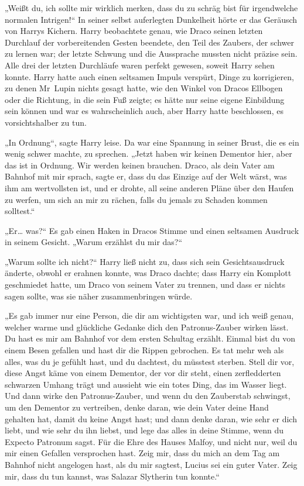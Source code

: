 {„Weißt du, ich sollte mir wirklich merken, dass du zu schräg bist für irgendwelche normalen Intrigen!“ In seiner selbst auferlegten Dunkelheit hörte er das Geräusch von Harrys Kichern. Harry beobachtete genau, wie Draco seinen letzten Durchlauf der vorbereitenden Gesten beendete, den Teil des Zaubers, der schwer zu lernen war; der letzte Schwung und die Aussprache mussten nicht präzise sein. Alle drei der letzten Durchläufe waren perfekt gewesen, soweit Harry sehen konnte. Harry hatte auch einen seltsamen Impuls verspürt, Dinge zu korrigieren, zu denen Mr~Lupin nichts gesagt hatte, wie den Winkel von Dracos Ellbogen oder die Richtung, in die sein Fuß zeigte; es hätte nur seine eigene Einbildung sein können und war es wahrscheinlich auch, aber Harry hatte beschlossen, es vorsichtshalber zu tun.

„In Ordnung“, sagte Harry leise. Da war eine Spannung in seiner Brust, die es ein wenig schwer machte, zu sprechen. „Jetzt haben wir keinen Dementor hier, aber das ist in Ordnung. Wir werden keinen brauchen. Draco, als dein Vater am Bahnhof mit mir sprach, sagte er, dass du das Einzige auf der Welt wärst, was ihm am wertvollsten ist, und er drohte, all seine anderen Pläne über den Haufen zu werfen, um sich an mir zu rächen, falls du jemals zu Schaden kommen solltest.“

„Er… was?“ Es gab einen Haken in Dracos Stimme und einen seltsamen Ausdruck in seinem Gesicht. „Warum erzählst du mir das?“

„Warum sollte ich nicht?“ Harry ließ nicht zu, dass sich sein Gesichtsausdruck änderte, obwohl er erahnen konnte, was Draco dachte; dass Harry ein Komplott geschmiedet hatte, um Draco von seinem Vater zu trennen, und dass er nichts sagen sollte, was sie näher zusammenbringen würde.

„Es gab immer nur eine Person, die dir am wichtigsten war, und ich weiß genau, welcher warme und glückliche Gedanke dich den Patronus-Zauber wirken lässt. Du hast es mir am Bahnhof vor dem ersten Schultag erzählt. Einmal bist du von einem Besen gefallen und hast dir die Rippen gebrochen. Es tat mehr weh als alles, was du je gefühlt hast, und du dachtest, du müsstest sterben. Stell dir vor, diese Angst käme von einem Dementor, der vor dir steht, einen zerfledderten schwarzen Umhang trägt und aussieht wie ein totes Ding, das im Wasser liegt. Und dann wirke den Patronus-Zauber, und wenn du den Zauberstab schwingst, um den Dementor zu vertreiben, denke daran, wie dein Vater deine Hand gehalten hat, damit du keine Angst hast; und dann denke daran, wie sehr er dich liebt, und wie sehr du ihn liebst, und lege das alles in deine Stimme, wenn du Expecto Patronum sagst. Für die Ehre des Hauses Malfoy, und nicht nur, weil du mir einen Gefallen versprochen hast. Zeig mir, dass du mich an dem Tag am Bahnhof nicht angelogen hast, als du mir sagtest, Lucius sei ein guter Vater. Zeig mir, dass du tun kannst, was Salazar Slytherin tun konnte.“

}

